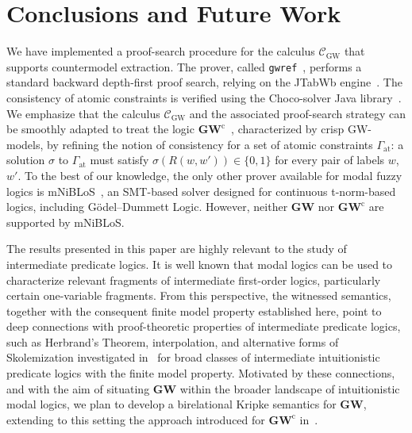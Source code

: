 \documentclass[copyright,creativecommons]{eptcs}
\newcommand{\GWCL}{\mathbf{GW}^\mathrm{c}}
\newcommand{\GWL}{\mathbf{GW}}
\newcommand{\GWM}{\mbox{$\mathrm{GW}$}}
\newcommand{\Calcw}{\Ccal_{\mathrm{GW}}}
\newcommand{\Gat}{\G_\mathrm{at}}
\newcommand{\s}{\sigma}
\newcommand{\G}{\Gamma}
\newcommand{\Ccal}{\mathcal{C}}
\begin{document}
\section{Conclusions and Future Work}


We have implemented a proof-search procedure for the calculus $\Calcw$
that supports countermodel extraction.  The prover, called
\texttt{gwref}~\cite{gwrefProver}, performs a standard backward
depth-first proof search, relying on the JTabWb
engine~\cite{FerrariFF:17a}. The consistency of atomic constraints is
verified using the Choco-solver Java library~\cite{ChocoSolver:2025}.
We emphasize that the calculus $\Calcw$ and the associated
proof-search strategy can be smoothly adapted to treat the logic
$\GWCL$~\cite{FerFioRod:2025}, characterized by crisp $\GWM$-models,
by refining the notion of consistency for a set of atomic constraints
$\Gat$: a solution $\s$ to $\Gat$ must satisfy $\s(R(w,w')) \in
\{0,1\}$ for every pair of labels $w$, $w'$.  To the best of our
knowledge, the only other prover available for modal fuzzy logics is
mNiBLoS~\cite{Vidal:16}, an SMT-based solver designed for continuous
t-norm-based logics, including G\"odel--Dummett Logic.  However,
neither $\GWL$ nor $\GWCL$ are supported by mNiBLoS.



The results presented in this paper are highly relevant to the study
of intermediate predicate logics. It is well known that modal logics
can be used to characterize relevant fragments of intermediate
first-order logics, particularly certain one-variable fragments. From
this perspective, the witnessed semantics, together with the consequent
finite model property established here, point to deep connections with
proof-theoretic properties of intermediate predicate logics, such as
Herbrand’s Theorem, interpolation, and alternative forms of
Skolemization investigated in~\cite{BI-IGPL2016} for broad classes of
intermediate intuitionistic predicate logics with the finite model
property.  Motivated by these connections, and with the aim of
situating $\GWL$ within the broader landscape of intuitionistic modal
logics, we plan to develop a birelational Kripke semantics for $\GWL$,
extending to this setting the approach introduced for $\GWCL$
in~\cite{FerFioRod:2025}.
\end{document}

